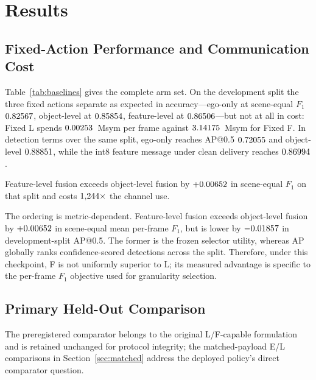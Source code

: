 \documentclass[journal]{IEEEtran}
\begin{document}
\section{Results}

\subsection{Fixed-Action Performance and Communication Cost}
Table~\ref{tab:baselines} gives the complete arm set. On the development split the three fixed
actions separate as expected in accuracy---ego-only at scene-equal $F_1$ $0.82567$,
object-level at $0.85854$, feature-level at $0.86506$---but not at all in cost:
Fixed L spends $0.00253$~Msym per frame against $3.14175$~Msym for Fixed F. In detection terms
over the same split, ego-only reaches AP@0.5 $0.72055$ and object-level $0.88851$,
while the int8 feature message under clean delivery reaches $0.86994$.

Feature-level fusion exceeds object-level fusion by $+0.00652$ in scene-equal $F_1$
on that split and costs $1{,}244\times$ the channel use.

The ordering is metric-dependent. Feature-level fusion exceeds object-level fusion by
$+0.00652$ in scene-equal mean per-frame $F_1$, but is lower by
$-0.01857$ in development-split AP@0.5. The former is the frozen selector utility,
whereas AP globally ranks confidence-scored detections across the split. Therefore, under this
checkpoint, F is not uniformly superior to L; its measured advantage is specific to the per-frame
$F_1$ objective used for granularity selection.

\begin{table}[t]
\caption{All evaluated arms. Development-split rows are where every choice was made. $\rho_E$,
$\rho_L$ and $\rho_F$ denote requested-action shares. On collaborator-unavailable frames, execution
is structurally forced to E regardless of the request; the effective utility and realised payload
already incorporate this rule. All ratios reported in the text are computed from the underlying
unrounded values; table entries are rounded for display.}
\label{tab:baselines}
\centering\small\setlength{\tabcolsep}{3pt}

\end{table}

\subsection{Primary Held-Out Comparison}\label{sec:primary}
The preregistered comparator belongs to the original L/F-capable formulation and is retained
unchanged for protocol integrity; the matched-payload E/L comparisons in
Section~\ref{sec:matched} address the deployed policy's direct comparator question.
\end{document}
